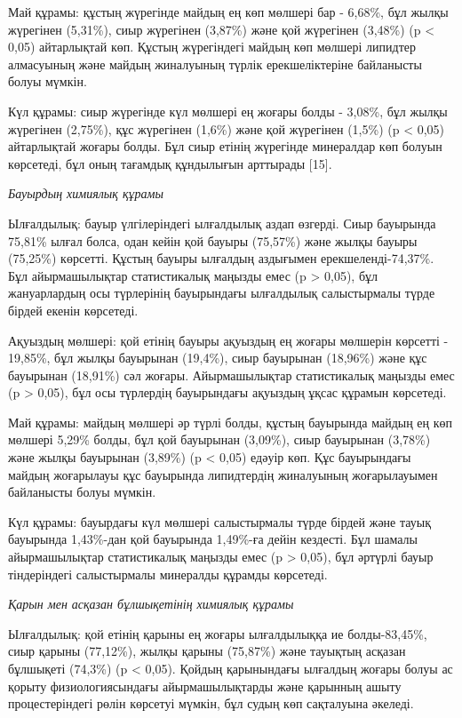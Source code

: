\begin{multicols}{2}
Май құрамы: құстың жүрегінде майдың ең көп мөлшері бар - 6,68\%, бұл
жылқы жүрегінен (5,31\%), сиыр жүрегінен (3,87\%) және қой жүрегінен
(3,48\%) (p \textless{} 0,05) айтарлықтай көп. Құстың жүрегіндегі майдың
көп мөлшері липидтер алмасуының және майдың жиналуының түрлік
ерекшеліктеріне байланысты болуы мүмкін.

Күл құрамы: сиыр жүрегінде күл мөлшері ең жоғары болды - 3,08\%, бұл
жылқы жүрегінен (2,75\%), құс жүрегінен (1,6\%) және қой жүрегінен
(1,5\%) (p \textless{} 0,05) айтарлықтай жоғары болды. Бұл сиыр етінің
жүрегінде минералдар көп болуын көрсетеді, бұл оның тағамдық құндылығын
арттырады {[}15{]}.

\emph{Бауырдың химиялық құрамы}

Ылғалдылық: бауыр үлгілеріндегі ылғалдылық аздап өзгерді. Сиыр бауырында
75,81\% ылғал болса, одан кейін қой бауыры (75,57\%) және жылқы бауыры
(75,25\%) көрсетті. Құстың бауыры ылғалдың аздығымен
ерекшеленді-74,37\%. Бұл айырмашылықтар статистикалық маңызды емес (p
\textgreater{} 0,05), бұл жануарлардың осы түрлерінің бауырындағы
ылғалдылық салыстырмалы түрде бірдей екенін көрсетеді.

Ақуыздың мөлшері: қой етінің бауыры ақуыздың ең жоғары мөлшерін көрсетті
- 19,85\%, бұл жылқы бауырынан (19,4\%), сиыр бауырынан (18,96\%) және
құс бауырынан (18,91\%) сәл жоғары. Айырмашылықтар статистикалық маңызды
емес (p \textgreater{} 0,05), бұл осы түрлердің бауырындағы ақуыздың
ұқсас құрамын көрсетеді.

Май құрамы: майдың мөлшері әр түрлі болды, құстың бауырында майдың ең
көп мөлшері 5,29\% болды, бұл қой бауырынан (3,09\%), сиыр бауырынан
(3,78\%) және жылқы бауырынан (3,89\%) (p \textless{} 0,05) едәуір көп.
Құс бауырындағы майдың жоғарылауы құс бауырында липидтердің жиналуының
жоғарылауымен байланысты болуы мүмкін.

Күл құрамы: бауырдағы күл мөлшері салыстырмалы түрде бірдей және тауық
бауырында 1,43\%-дан қой бауырында 1,49\%-ға дейін кездесті. Бұл шамалы
айырмашылықтар статистикалық маңызды емес (p \textgreater{} 0,05), бұл
әртүрлі бауыр тіндеріндегі салыстырмалы минералды құрамды көрсетеді.

\emph{Қарын мен асқазан бұлшықетінің химиялық құрамы}

Ылғалдылық: қой етінің қарыны ең жоғары ылғалдылыққа ие болды-83,45\%,
сиыр қарыны (77,12\%), жылқы қарыны (75,87\%) және тауықтың асқазан
бұлшықеті (74,3\%) (p \textless{} 0,05). Қойдың қарынындағы ылғалдың
жоғары болуы ас қорыту физиологиясындағы айырмашылықтарды және қарынның
ашыту процестеріндегі рөлін көрсетуі мүмкін, бұл судың көп сақталуына
әкеледі.


\end{multicols}
